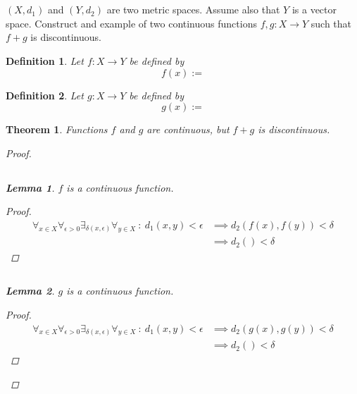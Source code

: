 \documentclass[]{article}
\newcommand{\st}{\ : \ }
\newtheorem{definition}{Definition}
\newtheorem{theorem}{Theorem}
\newtheorem{lemma}{Lemma}
\begin{document}
\newpage
\section{}
$(X,d_1)$ and $(Y,d_2)$ are two metric spaces.
Assume also that $Y$ is a vector space.
Construct and example of two continuous functions $f,g : X \to Y$ such that $f + g$ is discontinuous.

\begin{definition}
    Let $f : X \to Y$ be defined by
    \[
        f(x) := 
    \]
\end{definition}
\begin{definition}
    Let $g : X \to Y$ be defined by
    \[
        g(x) := 
    \]
\end{definition}

\begin{theorem}
    Functions $f$ and $g$ are continuous, but $f + g$ is discontinuous.
    \begin{proof}
        
        \subsection{}
        \begin{lemma}
            $f$ is a continuous function.
            \begin{proof}
                \begin{align*}
                    \forall_{x \in X} \forall_{\epsilon > 0} \exists_{\delta(x, \epsilon)} \forall_{y \in X} \st d_1(x,y) < \epsilon
                        &\implies d_2(f(x), f(y)) < \delta\\
                        &\implies d_2() < \delta
                \end{align*}
            \end{proof}
        \end{lemma}

        \subsection{}
        \begin{lemma}
            $g$ is a continuous function.
            \begin{proof}
                \begin{align*}
                    \forall_{x \in X} \forall_{\epsilon > 0} \exists_{\delta(x, \epsilon)} \forall_{y \in X} \st d_1(x,y) < \epsilon
                        &\implies d_2(g(x), g(y)) < \delta\\
                        &\implies d_2() < \delta
                \end{align*}
            \end{proof}
        \end{lemma}


\end{proof}
\end{theorem}
\end{document}
